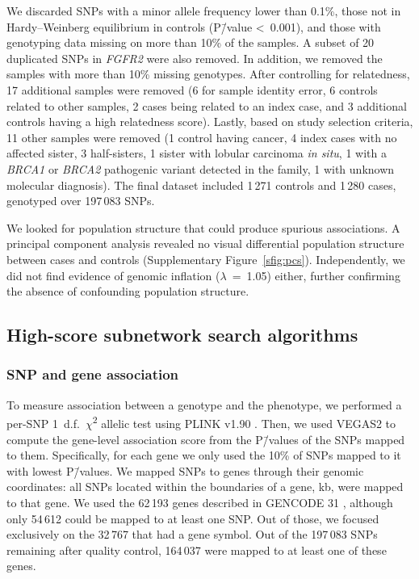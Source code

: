 \documentclass[draft,twocolumn, 11pt]{article}
\begin{document}
We discarded SNPs with a minor allele frequency lower than 0.1\%, those not in Hardy--Weinberg equilibrium in controls (P\=/value \textless~0.001), and those with genotyping data missing on more than 10\% of the samples. A subset of 20 duplicated SNPs in \emph{FGFR2} were also removed. In addition, we removed the samples with more than 10\% missing genotypes. After controlling for relatedness, 17 additional samples were removed (6 for sample identity error, 6 controls related to other samples, 2 cases being related to an index case, and 3 additional controls having a high relatedness score). Lastly, based on study selection criteria, 11 other samples were removed (1 control having cancer, 4 index cases with no affected sister, 3 half-sisters, 1 sister with lobular carcinoma \emph{in situ}, 1 with a \emph{BRCA1} or \emph{BRCA2} pathogenic variant detected in the family, 1 with unknown molecular diagnosis). The final dataset included 1\,271 controls and 1\,280 cases, genotyped over 197\,083 SNPs. 

We looked for population structure that could produce spurious associations. A principal component analysis revealed no visual differential population structure between cases and controls (Supplementary Figure~\ref{sfig:pcs}). Independently, we did not find evidence of genomic inflation (\(\lambda\)~=~1.05) either, further confirming the absence of confounding population structure.

\subsection{High-score subnetwork search algorithms}
\subsubsection{SNP and gene association}
\label{methods:node_score}
To measure association between a genotype and the phenotype, we performed a per-SNP 1~d.f.~\(\chi\)\textsuperscript{2} allelic test using PLINK v1.90 \cite{chang_second-generation_2015}. Then, we used VEGAS2 \cite{mishra_vegas2:_2015} to compute the gene-level association score from the P\=/values of the SNPs mapped to them. Specifically, for each gene we only used the 10\% of SNPs mapped to it with lowest P\=/values. We mapped SNPs to genes through their genomic coordinates: all SNPs located within the boundaries of a gene,  kb, were mapped to that gene. We used the 62\,193 genes described in GENCODE 31 \cite{frankish_gencode_2019}, although only 54\,612 could be mapped to at least one SNP. Out of those, we focused exclusively on the 32\,767 that had a gene symbol. Out of the 197\,083 SNPs remaining after quality control, 164\,037 were mapped to at least one of these genes. 
\end{document}
